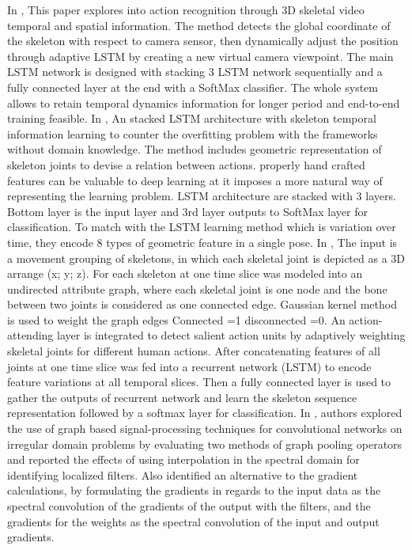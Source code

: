 \documentclass[11pt,english]{article}
\begin{document}
In \citep{zhang2017view}, This paper explores into action recognition through 3D skeletal video temporal and spatial information. The method detects the global coordinate of the skeleton with respect to camera sensor, then dynamically adjust the position through adaptive LSTM by creating a new virtual camera viewpoint. The main LSTM network is designed with stacking 3 LSTM network sequentially and a fully connected layer at the end with a SoftMax classifier. The whole system allows to retain temporal dynamics information for longer period and end-to-end training feasible. In \citep{zhang2017geometric}, An stacked LSTM architecture with skeleton temporal information learning to counter the overfitting problem with the frameworks without domain knowledge. The method includes geometric representation of skeleton joints to devise a relation between actions. properly hand crafted features can be valuable to deep learning at it imposes a more natural way of representing the learning problem. LSTM architecture are stacked with 3 layers. Bottom layer is the input layer and 3rd layer outputs to SoftMax layer for classification. To match with the LSTM learning method which is variation over time, they encode 8 types of geometric feature in a single pose.
In \citep{li2018action}, The input is a movement grouping of skeletons, in which each skeletal joint is depicted as a 3D arrange (x; y; z). For each skeleton at one time slice was modeled into an undirected attribute graph, where each skeletal joint is one node and the bone between two joints is considered as one connected edge. Gaussian kernel method is used to weight the graph edges Connected =1 disconnected =0. An action-attending layer is integrated to detect salient action units by adaptively weighting skeletal joints for different human actions. After concatenating features of all joints at one time slice was fed into a recurrent network (LSTM) to encode feature variations at all temporal slices. Then  a fully connected layer is used to gather the outputs of recurrent network and learn the skeleton sequence representation followed by a softmax layer for classification. In \citep{edwards2016graph}, authors explored the use of graph based signal-processing techniques for convolutional networks on irregular domain problems by evaluating two methods of graph pooling operators and reported the effects of using interpolation in the spectral domain for identifying localized filters. Also identified an alternative to the gradient calculations, by formulating the gradients in regards to the input data as the spectral convolution of the gradients of the output with the filters, and the gradients for the weights as the spectral convolution of the input and output gradients. 
\end{document}
